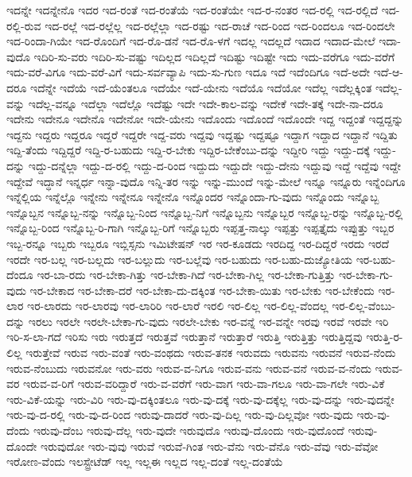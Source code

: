 {ಇದನ್ನೇ
ಇದನ್ನೇನೊ
ಇದರ
ಇದ-ರಂತೆ
ಇದ-ರಂತೆಯೆ
ಇದ-ರಂತೆಯೇ
ಇದ-ರ-ನಂತರ
ಇದ-ರಲ್ಲಿ
ಇದ-ರಲ್ಲಿದೆ
ಇದ-ರಲ್ಲಿ-ರುವ
ಇದ-ರಲ್ಲೆ
ಇದ-ರಲ್ಲೆಲ್ಲ
ಇದ-ರಲ್ಲೆಲ್ಲಾ
ಇದ-ರಷ್ಟು
ಇದ-ರಾಚೆ
ಇದ-ರಿಂದ
ಇದ-ರಿಂದಲೂ
ಇದ-ರಿಂದಲೇ
ಇದ-ರಿಂದಾ-ಗಿಯೇ
ಇದ-ರೊಂದಿಗೆ
ಇದ-ರೊ-ಡನೆ
ಇದ-ರೊ-ಳಗೆ
ಇದಲ್ಲ
ಇದಲ್ಲದೆ
ಇದಾದ
ಇದಾದ-ಮೇಲೆ
ಇದಾ-ವುದೊ
ಇದಿರಿ-ಸು-ವರು
ಇದಿರಿ-ಸು-ವಷ್ಟು
ಇದಿಲ್ಲದ
ಇದಿಲ್ಲದೆ
ಇದಿಷ್ಟು
ಇದಿಷ್ಟೇ
ಇದು
ಇದು-ವರೆಗೂ
ಇದು-ವರೆಗೆ
ಇದು-ವರೆ-ವಿಗೂ
ಇದು-ವರೆ-ವಿಗೆ
ಇದು-ಸರ್ವವ್ಯಾಪಿ
ಇದು-ಸು-ಗುಣ
ಇದೂ
ಇದೆ
ಇದೆಂದಿಗೂ
ಇದೆ-ಅದೇ
ಇದೆ-ಆ-ದರೂ
ಇದೆನ್ನೇ
ಇದೆಯೆ
ಇದೆ-ಯೆಂತಲೂ
ಇದೆಯೇ
ಇದೆ-ಯೇನು
ಇದೆಯೊ
ಇದೆಯೋ
ಇದೆಲ್ಲ
ಇದೆಲ್ಲಕ್ಕಿಂತ
ಇದೆಲ್ಲ-ವನ್ನು
ಇದೆಲ್ಲ-ವನ್ನೂ
ಇದೆಲ್ಲಾ
ಇದೆಲ್ಲೊ
ಇದೆಷ್ಟು
ಇದೇ
ಇದೇ-ಕಾಲ-ವನ್ನು
ಇದೇಕೆ
ಇದೇ-ತಕ್ಕೆ
ಇದೇ-ನಾ-ದರೂ
ಇದೇನು
ಇದೇನೂ
ಇದೇನೊ
ಇದೇನೋ
ಇದೇ-ಯೇನು
ಇದೊಂದು
ಇದೊಂದೆ
ಇದೊಂದೇ
ಇದ್ದ
ಇದ್ದಂತೆ
ಇದ್ದದ್ದನ್ನು
ಇದ್ದನು
ಇದ್ದರು
ಇದ್ದರೂ
ಇದ್ದರೆ
ಇದ್ದರೇ
ಇದ್ದ-ವರು
ಇದ್ದವು
ಇದ್ದಷ್ಟು
ಇದ್ದಷ್ಟೂ
ಇದ್ದಾಗ
ಇದ್ದಾದ
ಇದ್ದಾನೆ
ಇದ್ದಿತು
ಇದ್ದಿ-ತೆಂದು
ಇದ್ದಿದ್ದರೆ
ಇದ್ದಿ-ರ-ಬಹುದು
ಇದ್ದಿ-ರ-ಬೇಕು
ಇದ್ದಿರ-ಬೇಕೆಂಬು-ದನ್ನು
ಇದ್ದೀರಿ
ಇದ್ದು
ಇದ್ದು-ದಕ್ಕೆ
ಇದ್ದು-ದನ್ನು
ಇದ್ದು-ದನ್ನೆಲ್ಲಾ
ಇದ್ದು-ದ-ರಲ್ಲಿ
ಇದ್ದು-ದ-ರಿಂದ
ಇದ್ದುದು
ಇದ್ದುದೇ
ಇದ್ದು-ದೇನು
ಇದ್ದುವು
ಇದ್ದೆ
ಇದ್ದೆವು
ಇದ್ದೇ
ಇದ್ದೇವೆ
ಇದ್ಧಾನೆ
ಇನ್ನರ್ಧ
ಇನ್ನಾ-ವುದೊ
ಇನ್ನಿ-ತರ
ಇನ್ನು
ಇನ್ನು-ಮುಂದೆ
ಇನ್ನು-ಮೇಲೆ
ಇನ್ನೂ
ಇನ್ನೂರು
ಇನ್ನೆಂದಿಗೂ
ಇನ್ನೆಲ್ಲಿಯ
ಇನ್ನೆಲ್ಲೊ
ಇನ್ನೇನು
ಇನ್ನೇನೂ
ಇನ್ನೇನೊ
ಇನ್ನೊಂದರ
ಇನ್ನೊಂದಾ-ಗು-ವುದು
ಇನ್ನೊಂದು
ಇನ್ನೊಬ್ಬ
ಇನ್ನೊಬ್ಬನ
ಇನ್ನೊಬ್ಬ-ನನ್ನು
ಇನ್ನೊಬ್ಬ-ನಿಂದ
ಇನ್ನೊಬ್ಬ-ನಿಗೆ
ಇನ್ನೊಬ್ಬನು
ಇನ್ನೊಬ್ಬರ
ಇನ್ನೊಬ್ಬ-ರನ್ನು
ಇನ್ನೊಬ್ಬ-ರಲ್ಲಿ
ಇನ್ನೊಬ್ಬ-ರಿಂದ
ಇನ್ನೊಬ್ಬ-ರಿ-ಗಾಗಿ
ಇನ್ನೊಬ್ಬ-ರಿಗೆ
ಇನ್ನೊಬ್ಬರು
ಇಪ್ಪತ್ತ-ನಾಲ್ಕು
ಇಪ್ಪತ್ತು
ಇಪ್ಪತ್ತೈದು
ಇಪ್ಪುತ್ತು
ಇಬ್ಬರ
ಇಬ್ಬ-ರನ್ನೂ
ಇಬ್ಬರು
ಇಬ್ಬರೂ
ಇಬ್ಲಿಸ್ಸನು
ಇಮಿಟೇಷನ್
ಇರ
ಇರ-ಕೂಡದು
ಇರದಿದ್ದ
ಇರ-ದಿದ್ದರೆ
ಇರದು
ಇರದೆ
ಇರದೇ
ಇರ-ಬಲ್ಲ
ಇರ-ಬಲ್ಲದು
ಇರ-ಬಲ್ಲುದು
ಇರ-ಬಲ್ಲೆವು
ಇರ-ಬಹುದು
ಇರ-ಬಹು-ದುಜ್ಯೋತಿಯ
ಇರ-ಬಹು-ದೆಂದೂ
ಇರ-ಬಾ-ರದು
ಇರ-ಬೇಕಾ-ಗಿತ್ತು
ಇರ-ಬೇಕಾ-ಗಿದೆ
ಇರ-ಬೇಕಾ-ಗಿಲ್ಲ
ಇರ-ಬೇಕಾ-ಗುತ್ತಿತ್ತು
ಇರ-ಬೇಕಾ-ಗು-ವುದು
ಇರ-ಬೇಕಾದ
ಇರ-ಬೇಕಾ-ದರೆ
ಇರ-ಬೇಕಾ-ದು-ದಕ್ಕಿಂತ
ಇರ-ಬೇಕಾ-ಯಿತು
ಇರ-ಬೇಕು
ಇರ-ಬೇಕೆಂದು
ಇರ-ಲಾರ
ಇರ-ಲಾರದು
ಇರ-ಲಾರವು
ಇರ-ಲಾರಿರಿ
ಇರ-ಲಾರೆ
ಇರಲಿ
ಇರ-ಲಿಲ್ಲ
ಇರ-ಲಿಲ್ಲ-ವೆಂದಲ್ಲ
ಇರ-ಲಿಲ್ಲ-ವೆಂಬು-ದನ್ನು
ಇರಲು
ಇರಲೇ
ಇರಲೇ-ಬೇಕಾ-ಗು-ವುದು
ಇರಲೇ-ಬೇಕು
ಇರ-ವನ್ನೆ
ಇರ-ವನ್ನೇ
ಇರವು
ಇರವೆ
ಇರವೇ
ಇರಿ
ಇರಿ-ಸ-ಲಾ-ಗದೆ
ಇರಿಸು
ಇರು
ಇರುತ್ತದೆ
ಇರುತ್ತವೆ
ಇರುತ್ತಾನೆ
ಇರುತ್ತಾರೆ
ಇರುತ್ತಿ
ಇರುತ್ತಿತ್ತು
ಇರುತ್ತಿದ್ದವು
ಇರುತ್ತಿ-ರ-ಲಿಲ್ಲ
ಇರುತ್ತೇವೆ
ಇರುವ
ಇರು-ವಂತೆ
ಇರು-ವಂಥದು
ಇರುವ-ತನಕ
ಇರುವದು
ಇರುವನು
ಇರುವನೆ
ಇರುವ-ನೆಂದು
ಇರುವ-ನೆಂಬುದು
ಇರುವನೋ
ಇರು-ವರು
ಇರುವ-ವ-ನಿಗೂ
ಇರುವ-ವನು
ಇರುವ-ವನೆ
ಇರುವ-ವ-ನೆಂದು
ಇರುವ-ವರ
ಇರುವ-ವ-ರಿಗೆ
ಇರುವ-ವರಿದ್ದಾರೆ
ಇರು-ವ-ವರೆಗೆ
ಇರು-ವಾಗ
ಇರು-ವಾ-ಗಲೂ
ಇರು-ವಾ-ಗಲೇ
ಇರು-ವಿಕೆ
ಇರು-ವಿಕೆ-ಯನ್ನು
ಇರು-ವಿರಿ
ಇರು-ವು-ದಕ್ಕಿಂತಲೂ
ಇರು-ವು-ದಕ್ಕೆ
ಇರು-ವು-ದಕ್ಕೆಲ್ಲ
ಇರು-ವು-ದನ್ನು
ಇರು-ವುದನ್ನೇ
ಇರು-ವು-ದ-ರಲ್ಲಿ
ಇರು-ವು-ದ-ರಿಂದ
ಇರುವು-ದಾದರೆ
ಇರು-ವು-ದಿಲ್ಲ
ಇರು-ವು-ದಿಲ್ಲವೋ
ಇರು-ವುದು
ಇರು-ವು-ದೆಂದು
ಇರುವು-ದೆಂಬ
ಇರುವು-ದೆಲ್ಲ
ಇರು-ವುದೇ
ಇರುವುದೊ
ಇರುವು-ದೊಂದು
ಇರು-ವುದೊಂದೆ
ಇರುವು-ದೊಂದೇ
ಇರುವುದೋ
ಇರು-ವುವು
ಇರುವೆ
ಇರುವೆ-ಗಿಂತ
ಇರು-ವೆನು
ಇರು-ವೆನೊ
ಇರು-ವೆವು
ಇರು-ವೆವೋ
ಇರೋಣ-ವೆಂದು
ಇಲಸ್ಟ್ರೇಟೆಡ್
ಇಲ್ಲ
ಇಲ್ಲಈ
ಇಲ್ಲದ
ಇಲ್ಲ-ದಂತೆ
ಇಲ್ಲ-ದಂತೆಯೆ
}
